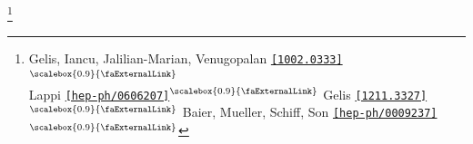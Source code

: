 \documentclass[aspectratio=169,11pt,usenames,dvipsnames]{beamer}
\renewcommand{\thefootnote}{\color{customblue}\faPaperPlaneO}
\newcommand\blfootnote[1]{%
  \begingroup
  \renewcommand\thefootnote{}\footnote{#1}%
  \addtocounter{footnote}{-1}%
  \endgroup
}
\begin{document}
\begin{frame}[noframenumbering]
\begin{columns}[onlytextwidth,t]
\begin{center}
            \end{center}
    \end{columns}
    \vspace{-5pt}
    \blfootnote{\scriptsize Gelis, Iancu, Jalilian-Marian, Venugopalan \href{https://arxiv.org/abs/1002.0333}{{\color{palgold}\texttt{[1002.0333]}$^\text{\scalebox{0.9}{\faExternalLink}}$}}  \\
     \hspace{13.5pt}
     Lappi \href{https://arxiv.org/abs/hep-ph/0606207}{{\color{palviolet}\texttt{[hep-ph/0606207]}$^\text{\scalebox{0.9}{\faExternalLink}}$}} Gelis \href{https://arxiv.org/abs/1211.3327}{{\color{palviolet}\texttt{[1211.3327]}$^\text{\scalebox{0.9}{\faExternalLink}}$}} Baier, Mueller, Schiff, Son \href{https://arxiv.org/abs/hep-ph/0009237}{{\color{palteal}\texttt{[hep-ph/0009237]}$^\text{\scalebox{0.9}{\faExternalLink}}$}}}
\end{frame}
\end{document}
